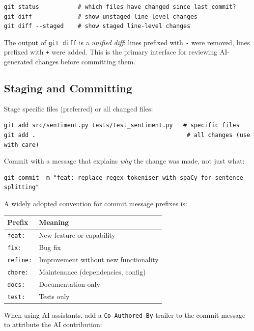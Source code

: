 \begin{verbatim}
git status           # which files have changed since last commit?
git diff             # show unstaged line-level changes
git diff --staged    # show staged line-level changes
\end{verbatim}

The output of \texttt{git diff} is a \emph{unified diff}: lines prefixed with
\texttt{-} were removed, lines prefixed with \texttt{+} were added.  This is
the primary interface for reviewing AI-generated changes before committing them.

\subsection{Staging and Committing}
\label{app:git:commit}

Stage specific files (preferred) or all changed files:

\begin{verbatim}
git add src/sentiment.py tests/test_sentiment.py   # specific files
git add .                                           # all changes (use with care)
\end{verbatim}

Commit with a message that explains \emph{why} the change was made, not just
what:

\begin{verbatim}
git commit -m "feat: replace regex tokeniser with spaCy for sentence splitting"
\end{verbatim}

A widely adopted convention for commit message prefixes is:

\begin{center}
\begin{tabular}{ll}
\toprule
Prefix & Meaning \\
\midrule
\texttt{feat:}   & New feature or capability \\
\texttt{fix:}    & Bug fix \\
\texttt{refine:} & Improvement without new functionality \\
\texttt{chore:}  & Maintenance (dependencies, config) \\
\texttt{docs:}   & Documentation only \\
\texttt{test:}   & Tests only \\
\bottomrule
\end{tabular}
\end{center}

When using AI assistants, add a \texttt{Co-Authored-By} trailer to the commit
message to attribute the AI contribution:

